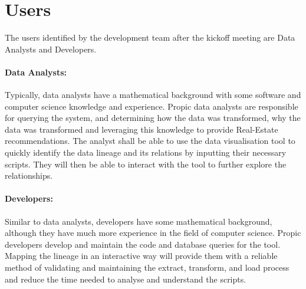 
\section{Users}
\begin{spacing}{1.3}
The users identified by the development team after the kickoff meeting are Data Analysts and Developers. 

\paragraph{Data Analysts:}
Typically, data analysts have a mathematical background with some software and computer science knowledge and experience. Propic data analysts are responsible for querying the system, and determining how the data was transformed, why the data was transformed and leveraging this knowledge to provide Real-Estate recommendations. The analyst shall be able to use the data visualisation tool to quickly identify the data lineage and its relations by inputting their necessary scripts. They will then be able to interact with the tool to further explore the relationships.

\paragraph{Developers:}
Similar to data analysts, developers have some mathematical background, although they have much more experience in the field of computer science. Propic developers develop and maintain the code and database queries for the tool. Mapping the lineage in an interactive way will provide them with a reliable method of validating and maintaining the extract, transform, and load process and reduce the time needed to analyse and understand the scripts. 


\end{spacing}